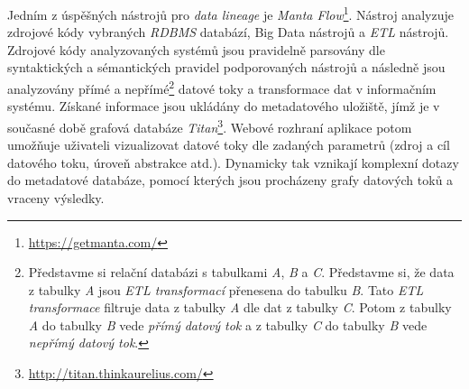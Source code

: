 Jedním z úspěšných nástrojů pro \textit{data lineage} je \textit{Manta Flow}\footnote{\url{https://getmanta.com/}}. Nástroj analyzuje zdrojové kódy vybraných \textit{RDBMS} databází, Big Data nástrojů a \textit{ETL} nástrojů.
Zdrojové kódy analyzovaných systémů jsou pravidelně parsovány dle syntaktických a sémantických pravidel podporovaných nástrojů a následně jsou analyzovány přímé a nepřímé\footnote{Představme si relační databázi s tabulkami \textit{A}, \textit{B} a \textit{C}. Představme si, že data z tabulky \textit{A} jsou \textit{ETL transformací} přenesena do tabulku \textit{B}. Tato \textit{ETL transformace} filtruje data z tabulky \textit{A} dle dat z tabulky \textit{C}. Potom z tabulky \textit{A} do tabulky \textit{B} vede \textit{přímý datový tok} a z tabulky \textit{C} do tabulky \textit{B} vede \textit{nepřímý datový tok}.} datové toky a transformace dat v informačním systému.
Získané informace jsou ukládány do metadatového uložiště, jímž je v současné době grafová databáze \textit{Titan}\footnote{\url{http://titan.thinkaurelius.com/}}. Webové rozhraní aplikace potom umožňuje uživateli vizualizovat datové toky dle zadaných parametrů (zdroj a cíl datového toku, úroveň abstrakce atd.). Dynamicky tak vznikají komplexní dotazy do metadatové databáze, pomocí kterých jsou procházeny grafy datových toků a vraceny výsledky.

